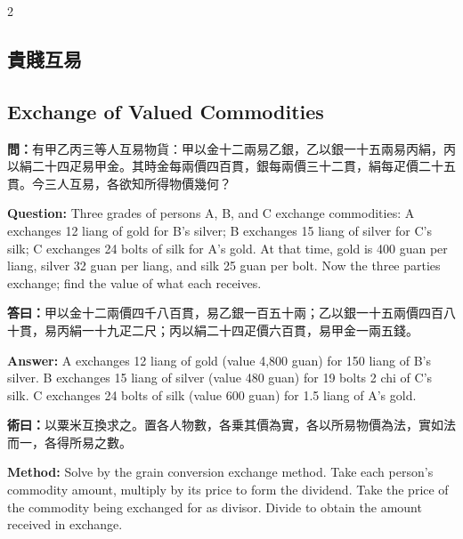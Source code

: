 \documentclass[11pt,a4paper]{article}
\newcommand{\QuestionText}[1]{\par\noindent\textbf{\color{problemcolor}問：}#1\par}
\newcommand{\AnswerText}[1]{\par\noindent\textbf{\color{answercolor}答曰：}#1\par}
\newcommand{\MethodText}[1]{\par\noindent\textbf{\color{methodcolor}術曰：}#1\par}
\newcommand{\QuestionEn}[1]{\par\noindent\textbf{\color{problemcolor}Question:} #1\par}
\newcommand{\AnswerEn}[1]{\par\noindent\textbf{\color{answercolor}Answer:} #1\par}
\newcommand{\MethodEn}[1]{\par\noindent\textbf{\color{methodcolor}Method:} #1\par}
\begin{document}
\begin{paracol}{2}

\subsection*{\color{sectioncolor}貴賤互易}
\switchcolumn
\subsection*{\color{sectioncolor}Exchange of Valued Commodities}
\switchcolumn*

\QuestionText{有甲乙丙三等人互易物貨：甲以金十二兩易乙銀，乙以銀一十五兩易丙絹，丙以絹二十四疋易甲金。其時金每兩價四百貫，銀每兩價三十二貫，絹每疋價二十五貫。今三人互易，各欲知所得物價幾何？}
\switchcolumn
\QuestionEn{Three grades of persons A, B, and C exchange commodities: A exchanges 12 liang of gold for B's silver; B exchanges 15 liang of silver for C's silk; C exchanges 24 bolts of silk for A's gold. At that time, gold is 400 guan per liang, silver 32 guan per liang, and silk 25 guan per bolt. Now the three parties exchange; find the value of what each receives.}
\switchcolumn*

\AnswerText{甲以金十二兩價四千八百貫，易乙銀一百五十兩；乙以銀一十五兩價四百八十貫，易丙絹一十九疋二尺；丙以絹二十四疋價六百貫，易甲金一兩五錢。}
\switchcolumn
\AnswerEn{A exchanges 12 liang of gold (value 4,800 guan) for 150 liang of B's silver. B exchanges 15 liang of silver (value 480 guan) for 19 bolts 2 chi of C's silk. C exchanges 24 bolts of silk (value 600 guan) for 1.5 liang of A's gold.}
\switchcolumn*

\MethodText{以粟米互換求之。置各人物數，各乗其價為實，各以所易物價為法，實如法而一，各得所易之數。}
\switchcolumn
\MethodEn{Solve by the grain conversion exchange method. Take each person's commodity amount, multiply by its price to form the dividend. Take the price of the commodity being exchanged for as divisor. Divide to obtain the amount received in exchange.}
\switchcolumn*


\end{paracol}
\end{document}
